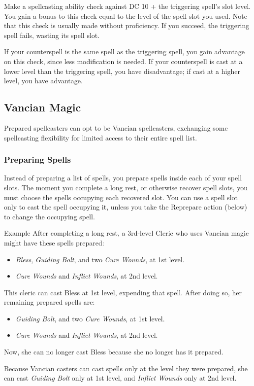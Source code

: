 \documentclass[letterpaper,twocolumn,openany,nodeprecatedcode,bg=print]{dndbook}
\begin{document}

Make a spellcasting ability check against DC 10 + the triggering spell's slot level. 
You gain a bonus to this check equal to the level of the spell slot you used. 
Note that this check is usually made without proficiency. 
If you succeed, the triggering spell fails, wasting its spell slot.

If your counterspell is the same spell as the triggering spell, you gain advantage on this check, since less modification is needed. 
If your counterspell is cast at a lower level than the triggering spell, you have disadvantage; if cast at a higher level, you have advantage.

\subsection{Vancian Magic}
Prepared spellcasters can opt to be Vancian spellcasters, 
exchanging some spellcasting flexibility for limited access to their entire spell list.

\subsubsection{Preparing Spells}
Instead of preparing a list of spells, you prepare spells inside each of your spell slots. 
The moment you complete a long rest, or otherwise recover spell slots, you must choose the spells occupying each recovered slot. 
You can use a spell slot only to cast the spell occupying it, unless you take the Reprepare action (below) to change the occupying spell.

\begin{DndComment}{Example}
After completing a long rest, a 3rd-level Cleric who uses Vancian magic might have these spells prepared:

\begin{itemize}
\item \textit{Bless}, \textit{Guiding Bolt}, and two \textit{Cure Wounds}, at 1st level.
\item \textit{Cure Wounds} and \textit{Inflict Wounds}, at 2nd level.
\end{itemize}

\noindent This cleric can cast Bless at 1st level, expending that spell. 
After doing so, her remaining prepared spells are:

\begin{itemize}
\item \textit{Guiding Bolt}, and two \textit{Cure Wounds}, at 1st level.
\item \textit{Cure Wounds} and \textit{Inflict Wounds}, at 2nd level.
\end{itemize}

\noindent Now, she can no longer cast Bless because she no longer has it prepared. 

Because Vancian casters can cast spells only at the level they were prepared, 
she can cast \textit{Guiding Bolt} only at 1st level, and \textit{Inflict Wounds} only at 2nd level.
\end{DndComment}
\end{document}
